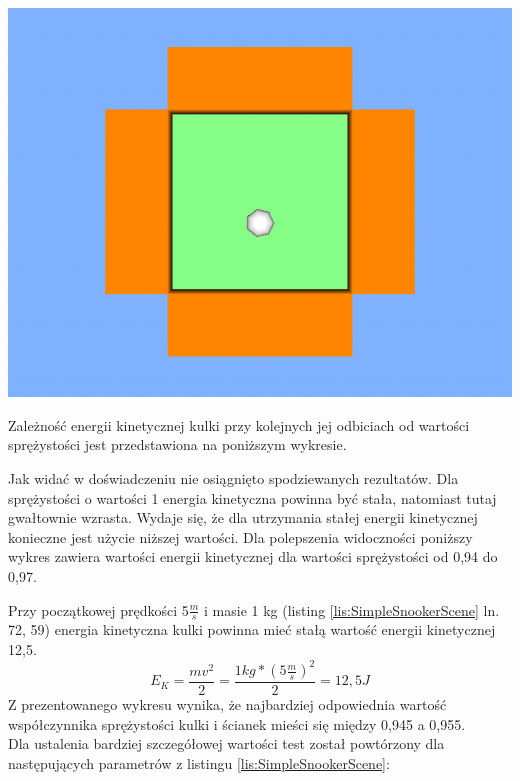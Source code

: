 \begin{center}
\includegraphics[scale = 0.5]{./img/SimpleSnookerScene.png}
\end{center}

Zależność energii kinetycznej kulki przy kolejnych jej odbiciach od wartości
sprężystości jest przedstawiona na poniższym wykresie.



Jak widać w doświadczeniu nie osiągnięto spodziewanych rezultatów. Dla
sprężystości o wartości 1 energia kinetyczna powinna być stała, natomiast tutaj
gwałtownie wzrasta. Wydaje się, że dla utrzymania stałej energii kinetycznej
konieczne jest użycie niższej wartości. Dla polepszenia widoczności poniższy
wykres zawiera wartości energii kinetycznej dla wartości sprężystości od 0,94 do
0,97.



Przy początkowej prędkości 5$\frac{m}{s}$ i masie 1 kg (listing
\ref{lis:SimpleSnookerScene} ln. 72, 59) energia kinetyczna kulki powinna mieć
stałą wartość energii kinetycznej 12,5.
\begin{equation}
E_{K} = \frac{mv^{2}}{2} = \frac{1kg*(5\frac{m}{s})^{2}}{2} =
12,5J
\end{equation}
Z prezentowanego wykresu wynika, że najbardziej odpowiednia wartość
współczynnika sprężystości kulki i ścianek mieści się między 0,945 a 0,955.\\
Dla ustalenia bardziej szczegółowej wartości test został powtórzony dla
następujących parametrów z listingu \ref{lis:SimpleSnookerScene}:

